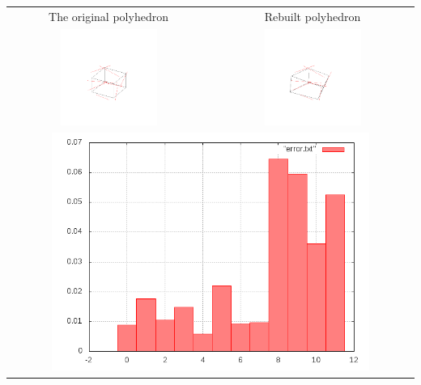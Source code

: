 \documentclass[11pt,fleqn,a4paper]{scrartcl}
\begin{document}
\begin{center}

\begin{tabular}{|c|c|}
\hline
The original polyhedron& Rebuilt polyhedron \\
\includegraphics[width=0.5\textwidth]{variant2/images/25/input.png} &
\includegraphics[width=0.5\textwidth]{variant2/images/25/out.png} \\
\midrule
\multicolumn{2}{|c|}{ \includegraphics[width=0.8\textwidth]{variant2/images/25/error.png}} \\
\hline
\end{tabular}
\end{center}
\newpage
\end{document}
